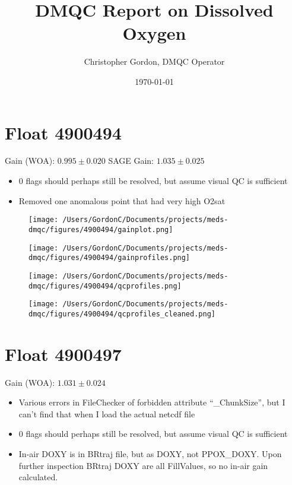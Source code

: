 

\title{DMQC Report on Dissolved Oxygen}
\author{Christopher Gordon, DMQC Operator}
\date{\today}


\maketitle
\clearpage
\section{Float 4900494}

Gain (WOA): $0.995 \pm 0.020$
SAGE Gain: $1.035 \pm 0.025$

\begin{itemize}
	\item 0 flags should perhaps still be resolved, but assume visual QC is sufficient
	\item Removed one anomalous point that had very high O2sat
\end{itemize}


\begin{figure}[H]
	\centering
	\texttt{[image: /Users/GordonC/Documents/projects/meds-dmqc/figures/4900494/gainplot.png]}
	\caption{}
\end{figure}


\begin{figure}[H]
	\centering
	\texttt{[image: /Users/GordonC/Documents/projects/meds-dmqc/figures/4900494/gainprofiles.png]}
	\caption{}
\end{figure}


\begin{figure}[H]
	\centering
	\texttt{[image: /Users/GordonC/Documents/projects/meds-dmqc/figures/4900494/qcprofiles.png]}
	\caption{}
\end{figure}


\begin{figure}[H]
	\centering
	\texttt{[image: /Users/GordonC/Documents/projects/meds-dmqc/figures/4900494/qcprofiles\_cleaned.png]}
	\caption{}
\end{figure}

\section{Float 4900497}

Gain (WOA): $1.031 \pm 0.024$

\begin{itemize}
	\item Various errors in FileChecker of forbidden attribute ``\_ChunkSize'', but I can't find that when I load the actual netcdf file
	\item 0 flags should perhaps still be resolved, but assume visual QC is sufficient
	\item In-air DOXY is in BRtraj file, but as DOXY, not PPOX\_DOXY. Upon further inspection BRtraj DOXY are all FillValues, so no in-air gain calculated.
\end{itemize}


